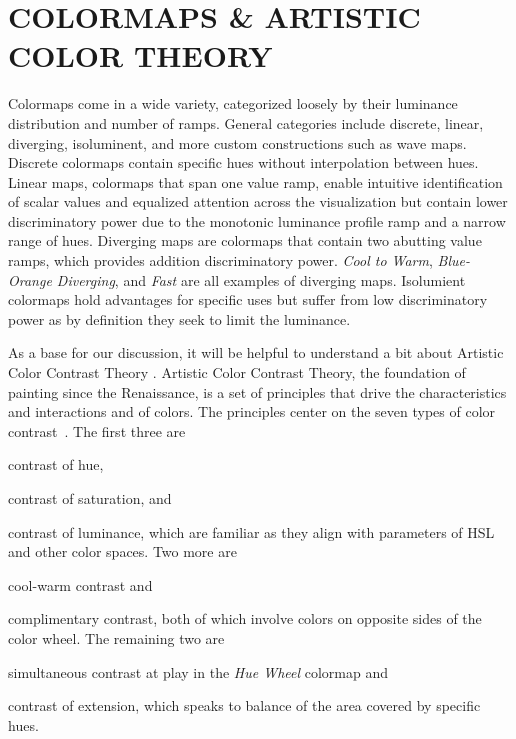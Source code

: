 \documentclass{IEEEcsmag}
\newcommand*{\km}[1]{\textcolor{km}{\emph{\textbf{#1} -- KM}}}
\newcommand*{\colormap}[1]{\textsl{#1}\xspace}
\newcommand*{\huewheel}{\colormap{Hue Wheel}}
\newcommand*{\coolwarm}{\colormap{Cool to Warm}}
\newcommand*{\blueorange}{\colormap{Blue-Orange Diverging}}
\newcommand*{\fast}{\colormap{Fast}}
\begin{document}
\section {COLORMAPS \& ARTISTIC COLOR THEORY}

Colormaps come in a wide variety, categorized loosely by their luminance distribution and number of ramps.
General categories include discrete, linear, diverging, isoluminent, and more custom constructions such as wave maps.
Discrete colormaps contain specific hues without interpolation between hues.
Linear maps, colormaps that span one value ramp, enable intuitive identification of scalar values and equalized attention across the visualization but contain lower discriminatory power due to the monotonic luminance profile ramp and a narrow range of hues.
Diverging maps are colormaps that contain two abutting value ramps, which provides addition discriminatory power.
\coolwarm, \blueorange, and \fast are all examples of diverging maps.
Isolumient colormaps hold advantages for specific uses but suffer from low discriminatory power as by definition they seek to limit the luminance.

As a base for our discussion, it will be helpful to understand a bit about Artistic Color Contrast Theory \cite{Itten, Albers}. Artistic Color Contrast Theory, the foundation of painting since the Renaissance, is a set of principles that drive the characteristics and interactions and of colors. The principles center on the seven types of color contrast~\cite{Itten}.
The first three are
\begin{inparaenum}[(1)]
\item contrast of hue,
\item contrast of saturation, and
\item contrast of luminance, which are familiar as they align with parameters of HSL and other color spaces.
Two more are
\item cool-warm contrast and
\item complimentary contrast, both of which involve colors on opposite sides of the color wheel.
The remaining two are
\item simultaneous contrast at play in the \huewheel colormap and
\item contrast of extension, which speaks to balance of the area covered by specific hues.
\end{inparaenum}
\end{document}
